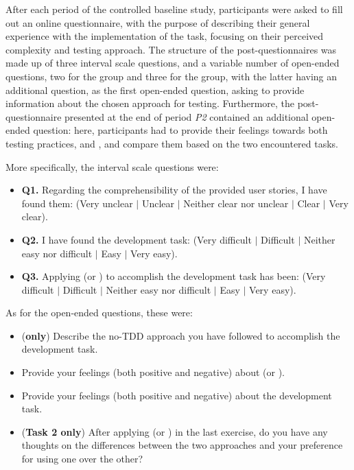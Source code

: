 After each period of the controlled baseline study, participants were asked to fill out an online questionnaire, with the purpose of describing their general experience with the implementation of the task, focusing on their perceived complexity and testing approach. 
The structure of the post-questionnaires was made up of three interval scale questions, and a variable number of open-ended questions, two for the \tdd group and three for the \notdd group, with the latter having an additional question, as the first open-ended question, asking to provide information about the chosen approach for testing. Furthermore, the post-questionnaire presented at the end of period \textit{P2} contained an additional open-ended question: here, participants had to provide their feelings towards both testing practices, \tdd and \notdd, and compare them based on the two encountered tasks. 

\noindent More specifically, the interval scale questions were:
\begin{itemize}
    \item \textbf{Q1.} Regarding the comprehensibility of the provided user stories, I have found them: (Very unclear $|$ Unclear $|$ Neither clear nor unclear $|$ Clear $|$ Very clear).
    \item \textbf{Q2.} I have found the development task: (Very difficult $|$ Difficult $|$ Neither easy nor difficult $|$ Easy $|$ Very easy).
    \item \textbf{Q3.} Applying (\ie \tdd or \notdd) to accomplish the development task has been: (Very difficult $|$ Difficult $|$ Neither easy nor difficult $|$ Easy $|$ Very easy).
\end{itemize}

\noindent As for the open-ended questions, these were:
\begin{itemize}
    \item (\textbf{\notdd only}) Describe the no-TDD approach you have followed to accomplish the development task.
    \item Provide your feelings (both positive and negative) about (\ie \tdd or \notdd).
    \item Provide your feelings (both positive and negative) about the development task.
    \item (\textbf{Task 2 only}) After applying (\ie \tdd or \notdd) in the last exercise, do you have any thoughts on the differences between the two approaches and your preference for using one over the other?
\end{itemize}

